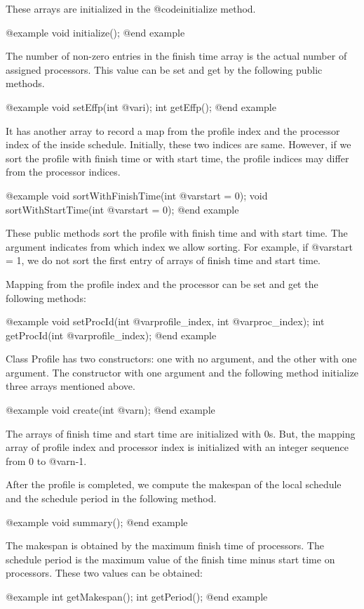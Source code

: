 {These arrays are initialized in the @code{initialize} method.

@example
void initialize();
@end example

The number of non-zero entries in the finish time array is the
actual number of assigned processors. This value can be set and get by
the following public methods.

@example
void setEffp(int @var{i});
int getEffp();
@end example

It has another array to record a map from the profile index and the 
processor index of the inside schedule. Initially, these two indices are
same. However, if we sort the profile with finish time or with start time,
the profile indices may differ from the processor indices.

@example
void sortWithFinishTime(int @var{start} = 0);
void sortWithStartTime(int @var{start} = 0);
@end example

These public methods sort the profile with finish time and with start time.
The argument indicates from which index we allow sorting. For example,
if @var{start} = 1, we do not sort the first entry of arrays of finish time
and start time. 

Mapping from the profile index and the processor can be set and get the
following methods:

@example
void setProcId(int @var{profile_index}, int @var{proc_index});
int getProcId(int @var{profile_index});
@end example

Class Profile has two constructors: one with no argument, and the other
with one argument. The constructor with one argument and the following method
initialize three arrays mentioned above.

@example
void create(int @var{n});
@end example

The arrays of finish time and start time are initialized with 0s. But,
the mapping array of profile index and processor index is initialized with
an integer sequence from 0 to @var{n}-1.

After the profile is completed, we compute the makespan of the local schedule
and the schedule period in the following method.

@example
void summary();
@end example

The makespan is obtained by the maximum finish time of processors.
The schedule period is the maximum value of the finish time minus start time
on processors. These two values can be obtained:

@example
int getMakespan();
int getPeriod();
@end example

}
